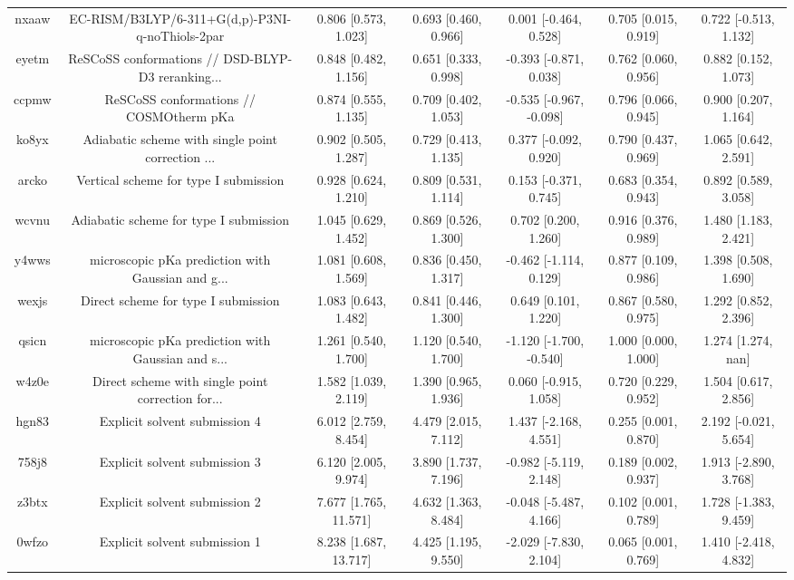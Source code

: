 \documentclass{article}
\begin{document}
\begin{center}
\begin{longtable}{|ccccccc|}
 nxaaw &    EC-RISM/B3LYP/6-311+G(d,p)-P3NI-q-noThiols-2par &   0.806 [0.573, 1.023] &  0.693 [0.460, 0.966] &    0.001 [-0.464, 0.528] &  0.705 [0.015, 0.919] &  0.722 [-0.513, 1.132] \\
 eyetm &  ReSCoSS conformations // DSD-BLYP-D3 reranking... &   0.848 [0.482, 1.156] &  0.651 [0.333, 0.998] &   -0.393 [-0.871, 0.038] &  0.762 [0.060, 0.956] &   0.882 [0.152, 1.073] \\
 ccpmw &            ReSCoSS conformations // COSMOtherm pKa &   0.874 [0.555, 1.135] &  0.709 [0.402, 1.053] &  -0.535 [-0.967, -0.098] &  0.796 [0.066, 0.945] &   0.900 [0.207, 1.164] \\
 ko8yx &  Adiabatic scheme with single point correction ... &   0.902 [0.505, 1.287] &  0.729 [0.413, 1.135] &    0.377 [-0.092, 0.920] &  0.790 [0.437, 0.969] &   1.065 [0.642, 2.591] \\
 arcko &              Vertical scheme for type I submission &   0.928 [0.624, 1.210] &  0.809 [0.531, 1.114] &    0.153 [-0.371, 0.745] &  0.683 [0.354, 0.943] &   0.892 [0.589, 3.058] \\
 wcvnu &             Adiabatic scheme for type I submission &   1.045 [0.629, 1.452] &  0.869 [0.526, 1.300] &     0.702 [0.200, 1.260] &  0.916 [0.376, 0.989] &   1.480 [1.183, 2.421] \\
 y4wws &  microscopic pKa prediction with Gaussian and g... &   1.081 [0.608, 1.569] &  0.836 [0.450, 1.317] &   -0.462 [-1.114, 0.129] &  0.877 [0.109, 0.986] &   1.398 [0.508, 1.690] \\
 wexjs &                Direct scheme for type I submission &   1.083 [0.643, 1.482] &  0.841 [0.446, 1.300] &     0.649 [0.101, 1.220] &  0.867 [0.580, 0.975] &   1.292 [0.852, 2.396] \\
 qsicn &  microscopic pKa prediction with Gaussian and s... &   1.261 [0.540, 1.700] &  1.120 [0.540, 1.700] &  -1.120 [-1.700, -0.540] &  1.000 [0.000, 1.000] &     1.274 [1.274, nan] \\
 w4z0e &  Direct scheme with single point correction for... &   1.582 [1.039, 2.119] &  1.390 [0.965, 1.936] &    0.060 [-0.915, 1.058] &  0.720 [0.229, 0.952] &   1.504 [0.617, 2.856] \\
 hgn83 &                      Explicit solvent submission 4 &   6.012 [2.759, 8.454] &  4.479 [2.015, 7.112] &    1.437 [-2.168, 4.551] &  0.255 [0.001, 0.870] &  2.192 [-0.021, 5.654] \\
 758j8 &                      Explicit solvent submission 3 &   6.120 [2.005, 9.974] &  3.890 [1.737, 7.196] &   -0.982 [-5.119, 2.148] &  0.189 [0.002, 0.937] &  1.913 [-2.890, 3.768] \\
 z3btx &                      Explicit solvent submission 2 &  7.677 [1.765, 11.571] &  4.632 [1.363, 8.484] &   -0.048 [-5.487, 4.166] &  0.102 [0.001, 0.789] &  1.728 [-1.383, 9.459] \\
 0wfzo &                      Explicit solvent submission 1 &  8.238 [1.687, 13.717] &  4.425 [1.195, 9.550] &   -2.029 [-7.830, 2.104] &  0.065 [0.001, 0.769] &  1.410 [-2.418, 4.832] \\
\end{longtable}
\end{center}
\end{document}
